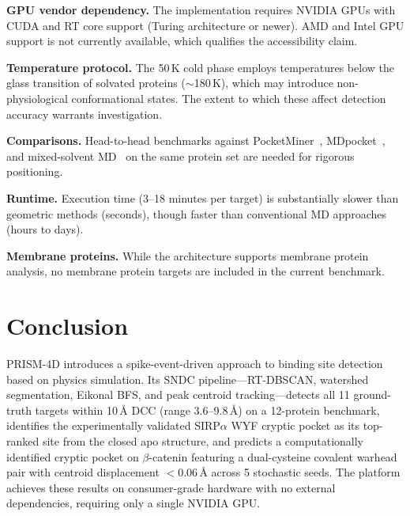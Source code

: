 \documentclass{sn-jnl}
\begin{document}
\textbf{GPU vendor dependency.} The implementation requires NVIDIA GPUs with CUDA and RT core
support (Turing architecture or newer). AMD and Intel GPU support is not currently available,
which qualifies the accessibility claim.

\textbf{Temperature protocol.} The 50\,K cold phase employs temperatures below the glass
transition of solvated proteins ($\sim$180\,K), which may introduce non-physiological
conformational states. The extent to which these affect detection accuracy warrants
investigation.

\textbf{Comparisons.} Head-to-head benchmarks against PocketMiner~\cite{meller2023},
MDpocket~\cite{schmidtke2011}, and mixed-solvent MD~\cite{ghanakota2016} on the same protein
set are needed for rigorous positioning.

\textbf{Runtime.} Execution time (3--18 minutes per target) is substantially slower than
geometric methods (seconds), though faster than conventional MD approaches (hours to days).

\textbf{Membrane proteins.} While the architecture supports membrane protein analysis, no
membrane protein targets are included in the current benchmark.

\section{Conclusion}

PRISM-4D introduces a spike-event-driven approach to binding site detection based on physics
simulation. Its SNDC pipeline---RT-DBSCAN, watershed segmentation, Eikonal BFS, and peak
centroid tracking---detects all 11 ground-truth targets within 10\,\AA{} DCC (range
3.6--9.8\,\AA{}) on a 12-protein benchmark, identifies the experimentally validated
SIRP$\alpha$ WYF cryptic pocket as its top-ranked site from the closed apo structure, and
predicts a computationally identified cryptic pocket on $\beta$-catenin featuring a
dual-cysteine covalent warhead pair with centroid displacement $<$0.06\,\AA{} across 5
stochastic seeds. The platform achieves these results on consumer-grade hardware with no
external dependencies, requiring only a single NVIDIA GPU.

\end{document}

